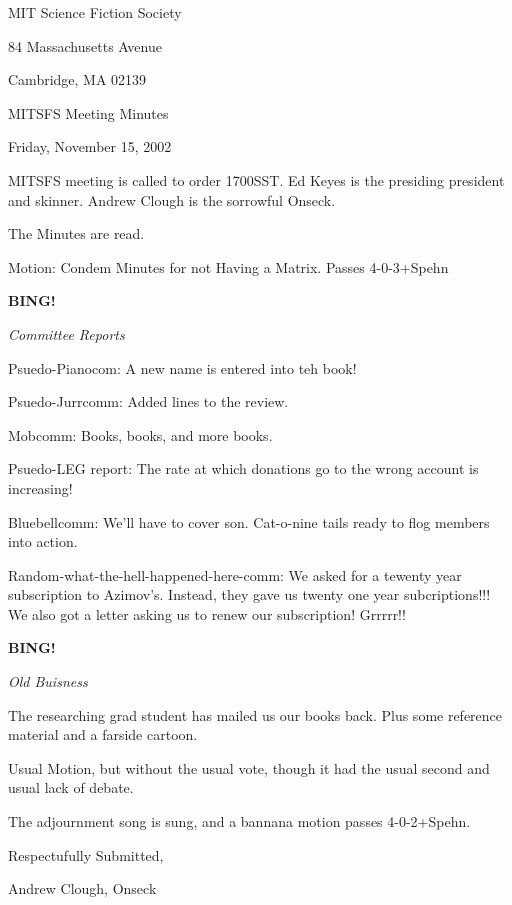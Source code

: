 \documentclass[12pt]{article}
\newcommand{\bing}{{\bf BING!} }
\newcommand{\goto}[1]{\bing \vskip 12pt \centerline{{\em{#1}}}}
\begin{document}
\begin{center}

MIT Science Fiction Society 

84 Massachusetts Avenue

Cambridge, MA 02139

\vspace{12pt}

MITSFS Meeting Minutes 

Friday, November 15, 2002

\end{center}

\vspace{18pt}

\setlength{\parskip}{6pt}

\noindent
MITSFS meeting is called to order 1700SST.  Ed Keyes is the presiding president and skinner.  Andrew Clough is the sorrowful Onseck.

The Minutes are read.

Motion:  Condem Minutes for not Having a Matrix.  Passes 4-0-3+Spehn

\goto{Committee Reports}

Psuedo-Pianocom:  A new name is entered into teh book!

Psuedo-Jurrcomm:  Added lines to the review.

Mobcomm:  Books, books, and more books.

Psuedo-LEG report:  The rate at which donations go to the wrong account is increasing!

Bluebellcomm:  We'll have to cover son.  Cat-o-nine tails ready to flog members into action.

Random-what-the-hell-happened-here-comm:  We asked for a tewenty year subscription to Azimov's.  Instead, they gave us twenty one year subcriptions!!!  We also got a letter asking us to renew our subscription!  Grrrrr!!

\goto{Old Buisness}

The researching grad student has mailed us our books back.  Plus some reference material and a farside cartoon.

Usual Motion, but without the usual vote, though it had the usual second and usual lack of debate.

The adjournment song is sung, and a bannana motion passes 4-0-2+Spehn.

\vspace{18pt}
\begin{center}

Respectufully Submitted,

Andrew Clough, Onseck

\end{center}
\end{document}
